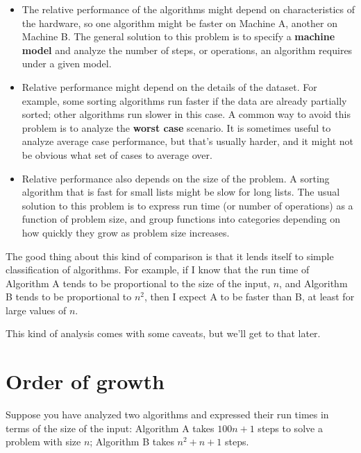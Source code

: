 \documentclass[10pt]{book}
\begin{document}
\begin{itemize}

\item The relative performance of the algorithms might
depend on characteristics of the hardware, so one algorithm
might be faster on Machine A, another on Machine B.
The general solution to this problem is to specify a
{\bf machine model} and analyze the number of steps, or
operations, an algorithm requires under a given model.

\item Relative performance might depend on the details of
the dataset.  For example, some sorting
algorithms run faster if the data are already partially sorted;
other algorithms run slower in this case.
A common way to avoid this problem is to analyze the
{\bf worst case} scenario.  It is sometimes useful to
analyze average case performance, but that's usually harder,
and it might not be obvious what set of cases to average over.

\item Relative performance also depends on the size of the
problem.  A sorting algorithm that is fast for small lists
might be slow for long lists.
The usual solution to this problem is to express run time
(or number of operations) as a function of problem size,
and group functions into categories depending on how quickly
they grow as problem size increases.

\end{itemize}

The good thing about this kind of comparison is that it lends
itself to simple classification of algorithms.  For example,
if I know that the run time of Algorithm A tends to be
proportional to the size of the input, $n$, and Algorithm B
tends to be proportional to $n^2$, then I
expect A to be faster than B, at least for large values of $n$.

This kind of analysis comes with some caveats, but we'll get
to that later.


\section{Order of growth}

Suppose you have analyzed two algorithms and expressed
their run times in terms of the size of the input:
Algorithm A takes $100n+1$ steps to solve a problem with
size $n$; Algorithm B takes $n^2 + n + 1$ steps.
\end{document}
